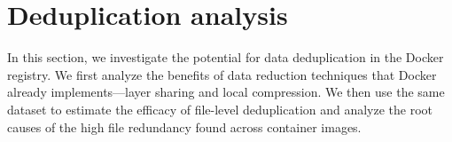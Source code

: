 \section{Deduplication analysis}
\label{sec:redundant_files}
In this section, we investigate the potential for data deduplication in the
Docker registry.
%
We first analyze the benefits of data reduction
techniques that Docker already implements---layer sharing and local
compression.
%
%
%
%
%
%
We then use the same dataset to estimate the efficacy of file-level
deduplication and analyze the root causes of the high file redundancy found
across container images.
%




